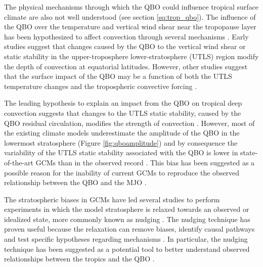 The physical mechanisms through which the QBO could influence tropical surface climate are also not well understood (see section \ref{sq:trop_qbo}). The influence of the QBO over the temperature and vertical wind shear near the tropopause layer \citep{tegtmeier2020b,martin2021variability} has been hypothesized to affect convection through several mechanisms \citep{haynes2021influence}.
Early studies \citep{gray1984,collimore2003} suggest that changes caused by the QBO to the vertical wind shear or static stability in the upper-troposphere lower-stratosphere (UTLS) region  modify the depth of convection at equatorial latitudes. However, other studies suggest that the surface impact of the QBO may be a function of both the UTLS temperature changes and the tropospheric convective forcing \citep{nie2015}.

The leading hypothesis to explain an impact from the QBO on tropical deep convection suggests that changes to the  UTLS static stability, caused by the QBO residual circulation, modifies the strength of convection  \citep{collimore2003,liess2012,nie2015,yamazaki2020tropospheric}. 
However, most of the existing climate models underestimate the amplitude of the QBO in the lowermost stratosphere (Figure \ref{fig:qboamplitude}) and by consequence the variability of the UTLS static stability associated with the QBO is lower in state-of-the-art GCMs than in the observed record \citep{schenzinger2017,richter2020,bushell2020}. 
This bias has been suggested as a possible reason for the inability of current GCMs to reproduce the observed relationship between the QBO and the MJO \citep{lee2018,kim2020}.

  
   The stratospheric biases in GCMs have led several studies to perform experiments in which the model stratosphere is relaxed towards an observed or idealized  state, more commonly known as nudging \citep[e.g.][]{garfinkel2011,lee2018,gray2020,richter2020,martin2021}. 
The nudging technique has proven useful because the relaxation can remove biases, identify causal pathways and test specific hypotheses regarding mechanisms \citep{gray2020,martin2021,haynes2021influence}. In particular, the nudging technique has been suggested as a potential tool to better understand observed relationships between the tropics and the QBO \citep{lee2018,martin2021}.

